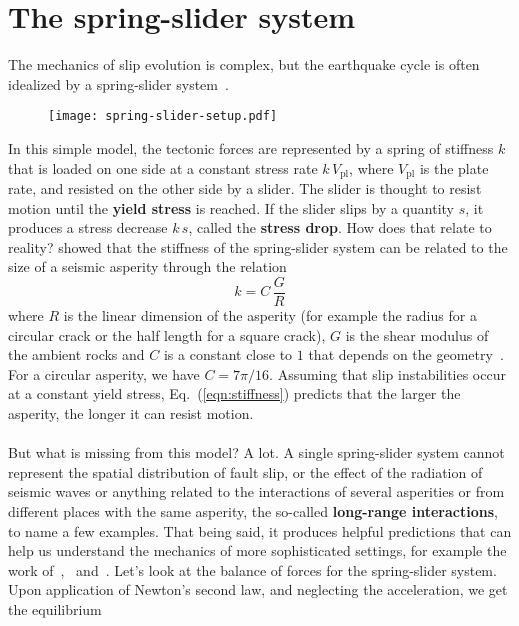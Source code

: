 \documentclass[letterpaper,12pt,]{memoir}
\begin{document}
\clearpage

\section{The spring-slider system}

The mechanics of slip evolution is complex, but the earthquake cycle is often idealized by a spring-slider system~\citep{ruina83}. 
%
\begin{figure}[h]
\begin{center}
\texttt{[image: spring-slider-setup.pdf]}
\end{center}
\end{figure}
%
In this simple model, the tectonic forces are represented by a spring of stiffness $k$ that is loaded on one side at a constant stress rate $k\,V_\text{pl}$, where $V_\text{pl}$ is the plate rate, and resisted on the other side by a slider. The slider is thought to resist motion until the \textbf{yield stress} is reached. If the slider slips by a quantity $s$, it produces a stress decrease $k\,s$, called the \textbf{stress drop}. How does that relate to reality? \cite{eshelby57} showed that the stiffness of the spring-slider system can be related to the size of a seismic asperity through the relation
\begin{equation}\label{eqn:stiffness}
k=C\,\frac{G}{R}
\end{equation}
where $R$ is the linear dimension of the asperity (for example the radius for a circular crack or the half length for a square crack), $G$ is the shear modulus of the ambient rocks and $C$ is a constant close to $1$ that depends on the geometry~\citep{eshelby57,kanamori&anderson75,shearer99a,fi07a}. For a circular asperity, we have $C=7\pi/16$. Assuming that slip instabilities occur at a constant yield stress, Eq.~(\ref{eqn:stiffness}) predicts that the larger the asperity, the longer it can resist motion. \\
\\
But what is missing from this model? A lot. A single spring-slider system cannot represent the spatial distribution of fault slip, or the effect of the radiation of seismic waves or anything related to the interactions of several asperities or from different places with the same asperity, the so-called \textbf{long-range interactions}, to name a few examples. That being said, it produces helpful predictions that can help us understand the mechanics of more sophisticated settings, for example the work of~\cite{ruina83},~\cite{scholz98a} and~\cite{becker00}. Let's look at the balance of forces for the spring-slider system. Upon application of Newton's second law, and neglecting the acceleration, we get the equilibrium 
\end{document}
